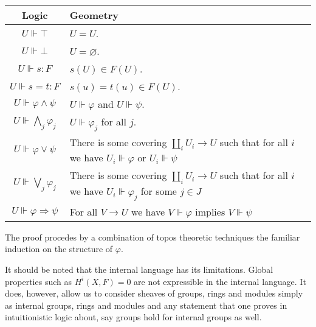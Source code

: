 \begin{construction}
\begin{center}
		\begin{tabular}{|c|p{8cm}|}
			\hline
			Logic                               & Geometry                                                                                                             \\
			\hline
			$U \Vdash \top$                     & $U = U$.                                                                                                             \\
			$U \Vdash \bot$                     & $U = \varnothing$.                                                                                                   \\
			$U \Vdash s \colon F$               & $s(U) \in F(U)$.                                                                                                     \\
			$U \Vdash s = t \colon F$           & $s(u) = t(u) \in F(U)$.                                                                                              \\
			$U \Vdash \varphi \land \psi$       & $U \Vdash \varphi$ and $U \Vdash \psi$.                                                                              \\
			$U \Vdash \bigwedge_{j} \varphi_j$  & $ U \Vdash \varphi_j $ for all $j$.                                                                                  \\
			$U \Vdash \varphi \vee \psi$        & There is some covering $\coprod_i U_i \to U$ such that for all $i$ we have $U_i \Vdash \varphi$ or $U_i \Vdash \psi$ \\
			$U \Vdash \bigvee_{j} \varphi_j$    & There is some covering $\coprod_i U_i \to U$ such that for all $i$ we have $U_i \Vdash \varphi_j$ for some $j \in J$ \\
			$U \Vdash \varphi \Rightarrow \psi$ & For all  $V \to U$ we have $V \Vdash \varphi$ implies $V \Vdash \psi$                                                \\
			\hline
		\end{tabular}
	\end{center}
	The proof procedes by a combination of topos theoretic techniques the familiar induction on the structure of $\varphi$.
\end{construction}
It should be noted that the internal language has its limitations. Global properties such as $H^i(X,F) = 0$ are not expressible in the internal language. It does, however,  allow us to consider sheaves of groups, rings and modules simply as internal groups, rings and modules and any statement that one proves in intuitionistic logic about, say groups hold for internal groups as well.
